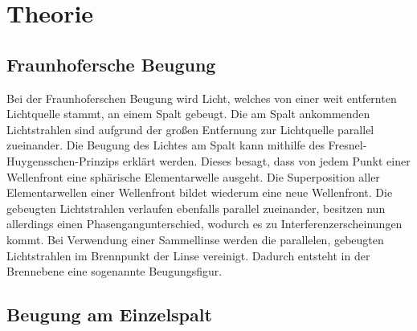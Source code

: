 
\section{Theorie}

\subsection{Fraunhofersche Beugung}

Bei der Fraunhoferschen Beugung wird Licht, welches von einer weit
entfernten Lichtquelle stammt, an einem Spalt gebeugt. Die am Spalt
ankommenden Lichtstrahlen sind aufgrund der großen Entfernung zur
Lichtquelle parallel zueinander.  Die Beugung des Lichtes am Spalt kann
mithilfe des Fresnel-Huygensschen-Prinzips erklärt werden. Dieses
besagt, dass von jedem Punkt einer Wellenfront eine sphärische
Elementarwelle ausgeht. Die Superposition aller Elementarwellen einer
Wellenfront bildet wiederum eine neue Wellenfront.  Die gebeugten
Lichtstrahlen verlaufen ebenfalls parallel zueinander, besitzen nun
allerdings einen Phasengangunterschied, wodurch es zu
Interferenzerscheinungen kommt. Bei Verwendung einer Sammellinse werden
die parallelen, gebeugten Lichtstrahlen im Brennpunkt der Linse
vereinigt. Dadurch entsteht in der Brennebene eine sogenannte
Beugungsfigur.
%
\subsection{Beugung am Einzelspalt}

